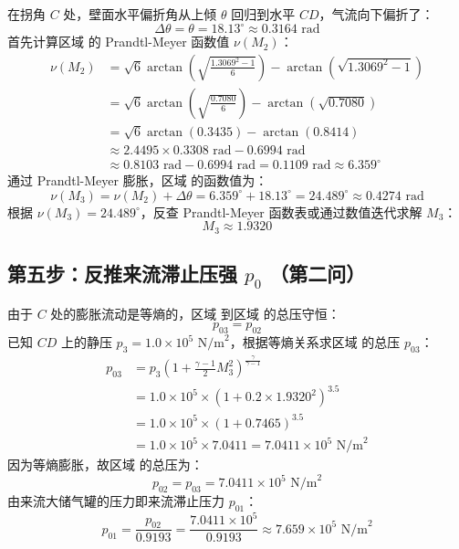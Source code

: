 \documentclass[a4paper,11pt]{article}
\begin{document}
在拐角 $C$ 处，壁面水平偏折角从上倾 $\theta$ 回归到水平 $CD$，气流向下偏折了：
\[
\Delta \theta = \theta = 18.13^\circ \approx 0.3164 \text{ rad}
\]
首先计算区域 \uppercase\expandafter{} 的 Prandtl-Meyer 函数值 $\nu(M_2)$：
\begin{align*}
    \nu(M_2) &= \sqrt{6} \arctan \left( \sqrt{\frac{1.3069^2-1}{6}} \right) - \arctan \left( \sqrt{1.3069^2-1} \right) \\
    &= \sqrt{6} \arctan \left( \sqrt{\frac{0.7080}{6}} \right) - \arctan \left( \sqrt{0.7080} \right) \\
    &= \sqrt{6} \arctan(0.3435) - \arctan(0.8414) \\
    &\approx 2.4495 \times 0.3308 \text{ rad} - 0.6994 \text{ rad} \\
    &\approx 0.8103 \text{ rad} - 0.6994 \text{ rad} = 0.1109 \text{ rad} \approx 6.359^\circ
\end{align*}
通过 Prandtl-Meyer 膨胀，区域 \uppercase\expandafter{} 的函数值为：
\begin{equation}
    \nu(M_3) = \nu(M_2) + \Delta \theta = 6.359^\circ + 18.13^\circ = 24.489^\circ \approx 0.4274 \text{ rad}
\end{equation}
根据 $\nu(M_3) = 24.489^\circ$，反查 Prandtl-Meyer 函数表或通过数值迭代求解 $M_3$：
\begin{equation}
    M_3 \approx 1.9320
\end{equation}

\subsection{第五步：反推来流滞止压强 $p_0$ （第二问）}

由于 $C$ 处的膨胀流动是等熵的，区域 \uppercase\expandafter{} 到区域 \uppercase\expandafter{} 的总压守恒：
\[
p_{03} = p_{02}
\]
已知 $CD$ 上的静压 $p_3 = 1.0 \times 10^5 \text{ N/m}^2$，根据等熵关系求区域 \uppercase\expandafter{} 的总压 $p_{03}$：
\begin{align}
    p_{03} &= p_3 \left( 1 + \frac{\gamma-1}{2} M_3^2 \right)^{\frac{\gamma}{\gamma-1}} \nonumber \\
    &= 1.0 \times 10^5 \times \left( 1 + 0.2 \times 1.9320^2 \right)^{3.5} \nonumber \\
    &= 1.0 \times 10^5 \times (1 + 0.7465)^{3.5} \nonumber \\
    &= 1.0 \times 10^5 \times 7.0411 = 7.0411 \times 10^5 \text{ N/m}^2
\end{align}
因为等熵膨胀，故区域 \uppercase\expandafter{} 的总压为：
\[
p_{02} = p_{03} = 7.0411 \times 10^5 \text{ N/m}^2
\]
由来流大储气罐的压力即来流滞止压力 $p_{01}$：
\begin{equation}
    p_{01} = \frac{p_{02}}{0.9193} = \frac{7.0411 \times 10^5}{0.9193} \approx 7.659 \times 10^5 \text{ N/m}^2
\end{equation}
\end{document}
